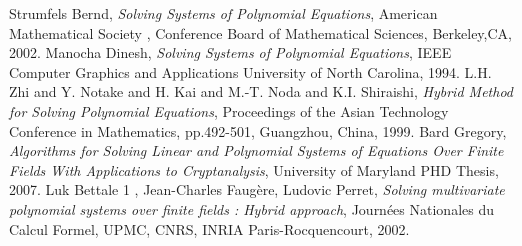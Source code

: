 \documentclass[11pt]{article}
\begin{document}
\begin{thebibliography}{1}
  Strumfels Bernd,
  \textit{Solving Systems of Polynomial Equations},
   American Mathematical Society , Conference Board of Mathematical Sciences,
   Berkeley,CA,
   2002.
  Manocha Dinesh,
  \textit{Solving Systems of Polynomial Equations},
   IEEE Computer Graphics and Applications
   University of North Carolina,
   1994.
  L.H. Zhi and Y. Notake and H. Kai and M.-T. Noda and K.I. Shiraishi,
  \textit{Hybrid Method for Solving Polynomial Equations},
   Proceedings of the Asian Technology Conference in Mathematics, pp.492-501, Guangzhou, China, 1999. 
  Bard Gregory,
  \textit{Algorithms for Solving Linear and Polynomial Systems of Equations Over Finite Fields With Applications to Cryptanalysis},
   University of Maryland PHD Thesis,
   2007.
  Luk Bettale 1 , Jean-Charles Faugère, Ludovic Perret,
  \textit{Solving multivariate polynomial systems over finite fields : Hybrid approach},
   Journées Nationales du Calcul Formel,
   UPMC, CNRS, INRIA Paris-Rocquencourt,
   2002.
   

\end{thebibliography}
\end{document}
